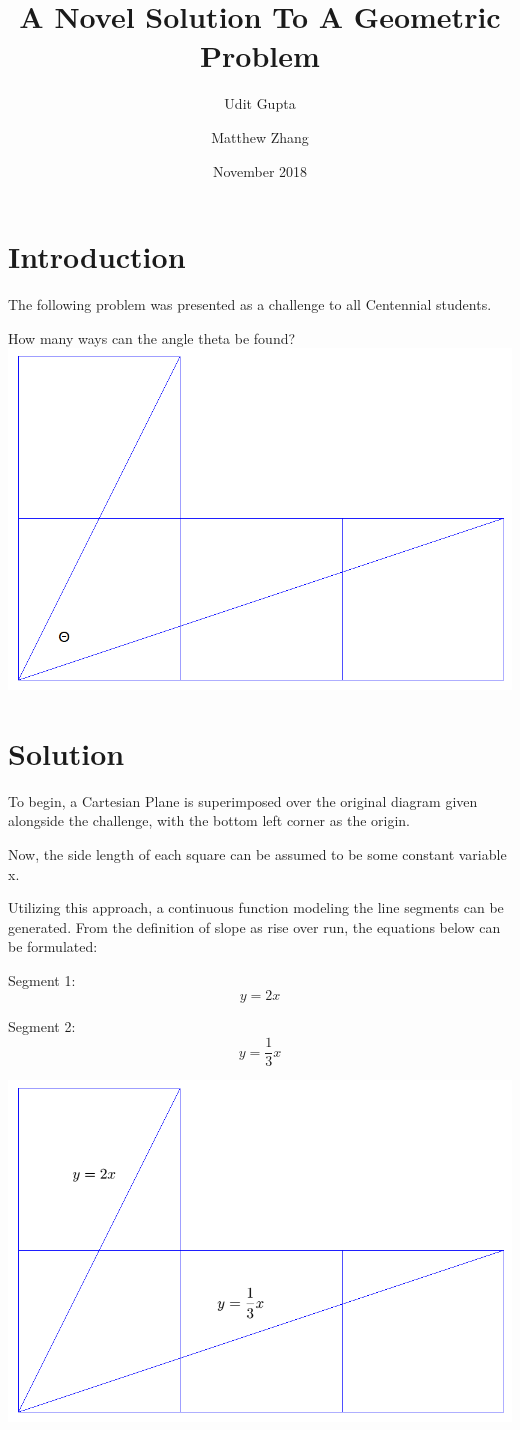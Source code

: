 \documentclass{article}
\title{A Novel Solution To A Geometric Problem}
\author{Udit Gupta \and Matthew Zhang}
\date{November 2018}
\begin{document}
\maketitle


\section*{Introduction}
The following problem was presented as a challenge to all Centennial students.
\begin{center}
	How many ways can the angle theta be found?
	\includegraphics[width=.8\linewidth]{originalTheta.png}
\end{center}

\section*{Solution}
To begin, a Cartesian Plane is superimposed over the original diagram given alongside the challenge, with the bottom left corner as the origin.

Now, the side length of each square can be assumed to be some constant variable x.

\pagebreak

Utilizing this approach, a continuous function modeling the line segments can be generated. From the definition of slope as rise over run, the equations below can be formulated:
\newline

 Segment 1: $$ y=2x$$
 
 Segment 2: $$  y=\frac{1}{3}x$$
\begin{center}
	\includegraphics[width=.8\linewidth]{equations.png}
\end{center}
\end{document}
